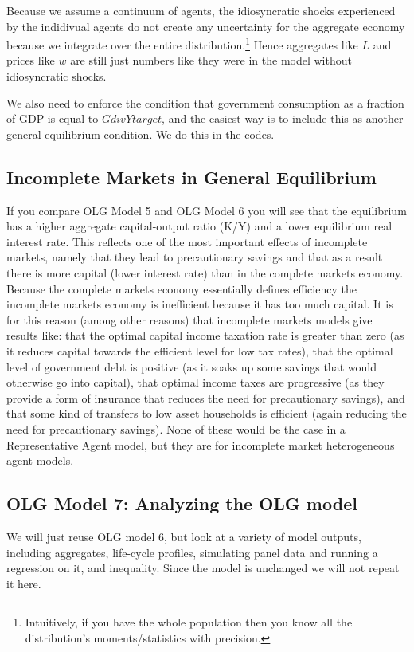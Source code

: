 Because we assume a continuum of agents, the idiosyncratic shocks experienced by the indidivual agents do not create any uncertainty for the aggregate economy because we integrate over the entire distribution.\footnote{Intuitively, if you have the whole population then you know all the distribution's moments/statistics with precision.} Hence aggregates like $L$ and prices like $w$ are still just numbers like they were in the model without idiosyncratic shocks.

We also need to enforce the condition that government consumption as a fraction of GDP is equal to $GdivYtarget$, and the easiest way is to include this as another general equilibrium condition. We do this in the codes.

\subsection{Incomplete Markets in General Equilibrium}
If you compare OLG Model 5 and OLG Model 6 you will see that the equilibrium has a higher aggregate capital-output ratio (K/Y) and a lower equilibrium real interest rate. This reflects one of the most important effects of incomplete markets, namely that they lead to precautionary savings and that as a result there is more capital (lower interest rate) than in the complete markets economy. Because the complete markets economy essentially defines efficiency the incomplete markets economy is inefficient because it has too much capital. It is for this reason (among other reasons) that incomplete markets models give results like: that the optimal capital income taxation rate is greater than zero (as it reduces capital towards the efficient level for low tax rates), that the optimal level of government debt is positive (as it soaks up some savings that would otherwise go into capital), that optimal income taxes are progressive (as they provide a form of insurance that reduces the need for precautionary savings), and that some kind of transfers to low asset households is efficient (again reducing the need for precautionary savings). None of these would be the case in a Representative Agent model, but they are for incomplete market heterogeneous agent models.

\subsection{OLG Model 7: Analyzing the OLG model}
We will just reuse OLG model 6, but look at a variety of model outputs, including aggregates, life-cycle profiles, simulating panel data and running a regression on it, and inequality. Since the model is unchanged we will not repeat it here.

